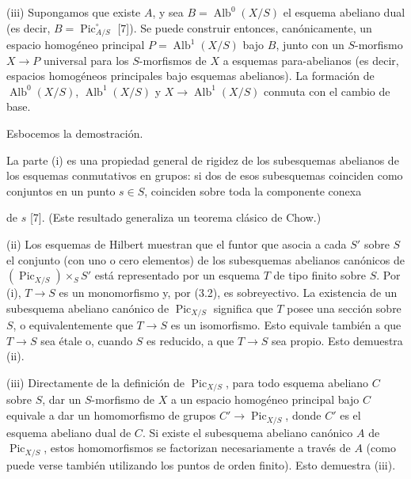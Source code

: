 \noindent(iii) Supongamos que existe $A$, y sea
$B=\operatorname{Alb}^0(X/S)$ el esquema abeliano dual (es decir,
$B=\operatorname{Pic}_{A/S}^\circ$ [7]). Se puede construir entonces,
canónicamente, un espacio homogéneo principal
$P=\operatorname{Alb}^1(X/S)$ bajo $B$, junto con un $S$-morfismo
$X\longrightarrow P$ universal para los $S$-morfismos de $X$ a esquemas
para-abelianos (es decir, espacios homogéneos principales bajo esquemas
abelianos). La formación de $\operatorname{Alb}^0(X/S)$,
$\operatorname{Alb}^1(X/S)$ y
$X\longrightarrow\operatorname{Alb}^1(X/S)$ conmuta con el cambio de base.

Esbocemos la demostración.

La parte (i) es una propiedad general de rigidez de los subesquemas abelianos
de los esquemas conmutativos en grupos: si dos de esos subesquemas coinciden
como conjuntos en un punto $s\in S$, coinciden sobre toda la componente conexa

de $s$ [7]. (Este resultado generaliza un teorema clásico de Chow.)

(ii) Los esquemas de Hilbert muestran que el funtor que asocia a cada $S'$ sobre
$S$ el conjunto (con uno o cero elementos) de los subesquemas abelianos
canónicos de $(\operatorname{Pic}_{X/S})\times_S S'$ está representado por un
esquema $T$ de tipo finito sobre $S$. Por (i), $T\longrightarrow S$ es un
monomorfismo y, por (3.2), es sobreyectivo. La existencia de un subesquema
abeliano canónico de $\operatorname{Pic}_{X/S}$ significa que $T$ posee una
sección sobre $S$, o equivalentemente que $T\longrightarrow S$ es un
isomorfismo. Esto equivale también a que $T\longrightarrow S$ sea étale o,
cuando $S$ es reducido, a que $T\longrightarrow S$ sea propio. Esto demuestra
(ii).

(iii) Directamente de la definición de $\operatorname{Pic}_{X/S}$, para todo
esquema abeliano $C$ sobre $S$, dar un $S$-morfismo de $X$ a un espacio
homogéneo principal bajo $C$ equivale a dar un homomorfismo de grupos
$C'\longrightarrow\operatorname{Pic}_{X/S}$, donde $C'$ es el esquema abeliano
dual de $C$. Si existe el subesquema abeliano canónico $A$ de
$\operatorname{Pic}_{X/S}$, estos homomorfismos se factorizan necesariamente a
través de $A$ (como puede verse también utilizando los puntos de orden finito).
Esto demuestra (iii).


